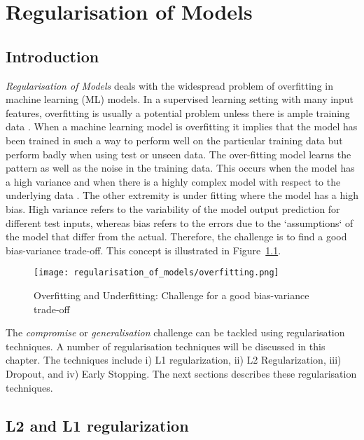 \chapter{Regularisation of Models}
\label{ch:regularisation-of-models}


\section{Introduction}


\textit{Regularisation of Models} deals with the widespread problem of overfitting in machine learning (ML) models. In a supervised learning setting with many input features, overﬁtting is usually a potential problem unless there is ample training data \citep{ng2004feature}. When a machine learning model is overfitting it implies that the model has been trained in such a way to perform well on the particular training data but perform badly when using test or unseen data. The over-fitting model learns the pattern as well as the noise in the training data. This occurs when the model has a high variance and when there is a highly complex model with respect to the underlying data \citep{pythonmachinelearning}. The other extremity is under fitting where the model has a high bias. High variance refers to the variability of the model output prediction for different test inputs, whereas bias refers to the errors due to the `assumptions` of the model that differ from the actual. Therefore, the challenge is to find a good bias-variance trade-off. This concept is illustrated in Figure~\ref{fig:rom_overfitting}.


\begin{figure}
   \texttt{[image: regularisation\_of\_models/overfitting.png]}
  \caption{Overfitting and Underfitting: Challenge for a good bias-variance trade-off}
  \label{fig:rom_overfitting}
\end{figure}


The \textit{compromise} or \textit{generalisation} challenge can be tackled using regularisation techniques. A number of regularisation techniques will be discussed in this chapter. The techniques include i) L1 regularization, ii) L2 Regularization, iii) Dropout, and iv) Early Stopping. The next sections describes these regularisation techniques.


\section{L2 and L1 regularization} 


